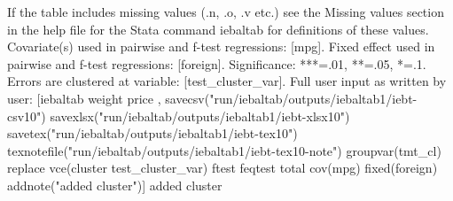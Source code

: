 If the table includes missing values (.n, .o, .v etc.) see the Missing values section in the help file for the Stata command iebaltab for definitions of these values. Covariate(s) used in pairwise and f-test regressions: [mpg]. Fixed effect used in pairwise and f-test regressions: [foreign]. Significance: ***=.01, **=.05, *=.1. Errors are clustered at variable: [test\_cluster\_var]. Full user input as written by user: [iebaltab weight price , savecsv("run/iebaltab/outputs/iebaltab1/iebt-csv10") savexlsx("run/iebaltab/outputs/iebaltab1/iebt-xlsx10") savetex("run/iebaltab/outputs/iebaltab1/iebt-tex10") texnotefile("run/iebaltab/outputs/iebaltab1/iebt-tex10-note") groupvar(tmt\_cl) replace vce(cluster test\_cluster\_var) ftest feqtest total cov(mpg) fixed(foreign) addnote("added cluster")] added cluster
